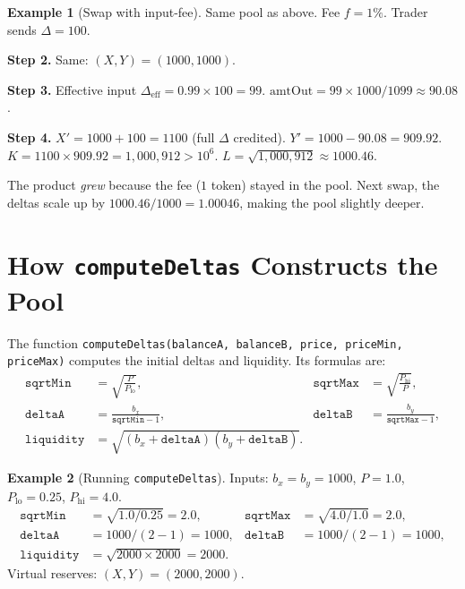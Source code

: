 \documentclass[11pt]{article}
\theoremstyle{definition}
\newtheorem{example}{Example}
\begin{document}
\begin{example}[Swap with input-fee]\label{ex:walkthrough-fee}
Same pool as above.  Fee $f = 1\%$.  Trader sends $\Delta = 100$.

\textbf{Step 2.}  Same: $(X, Y) = (1000, 1000)$.

\textbf{Step 3.}
Effective input $\Delta_{\mathrm{eff}} = 0.99 \times 100 = 99$.
$\mathrm{amtOut} = 99 \times 1000 / 1099 \approx 90.08$.

\textbf{Step 4.}
$X' = 1000 + 100 = 1100$ (full $\Delta$ credited).
$Y' = 1000 - 90.08 = 909.92$.
$K = 1100 \times 909.92 = 1{,}000{,}912 > 10^6$.
$L = \sqrt{1{,}000{,}912} \approx 1000.46$.

The product \emph{grew} because the fee ($1$ token) stayed in the pool.
Next swap, the deltas scale up by $1000.46/1000 = 1.00046$, making the pool
slightly deeper.
\end{example}


\section{How \texttt{computeDeltas} Constructs the Pool}\label{sec:computeDeltas}

The function \texttt{computeDeltas(balanceA, balanceB, price, priceMin, priceMax)}
computes the initial deltas and liquidity.  Its formulas are:
\begin{align}
\texttt{sqrtMin} &= \sqrt{\frac{P}{P_{\mathrm{lo}}}}, &
\texttt{sqrtMax} &= \sqrt{\frac{P_{\mathrm{hi}}}{P}}, \label{eq:impl-sqrts}\\[4pt]
\texttt{deltaA} &= \frac{b_x}{\texttt{sqrtMin} - 1}, &
\texttt{deltaB} &= \frac{b_y}{\texttt{sqrtMax} - 1}, \label{eq:impl-deltas}\\[4pt]
\texttt{liquidity} &= \sqrt{(b_x + \texttt{deltaA})(b_y + \texttt{deltaB})}.
\label{eq:impl-L}
\end{align}

\begin{example}[Running \texttt{computeDeltas}]\label{ex:computeDeltas}
Inputs: $b_x = b_y = 1000$, $P = 1.0$, $P_{\mathrm{lo}} = 0.25$,
$P_{\mathrm{hi}} = 4.0$.
\begin{align*}
\texttt{sqrtMin} &= \sqrt{1.0/0.25} = 2.0, &
\texttt{sqrtMax} &= \sqrt{4.0/1.0} = 2.0,\\
\texttt{deltaA} &= 1000 / (2 - 1) = 1000, &
\texttt{deltaB} &= 1000 / (2 - 1) = 1000,\\
\texttt{liquidity} &= \sqrt{2000 \times 2000} = 2000.
\end{align*}
Virtual reserves: $(X, Y) = (2000, 2000)$.
\end{example}
\end{document}
